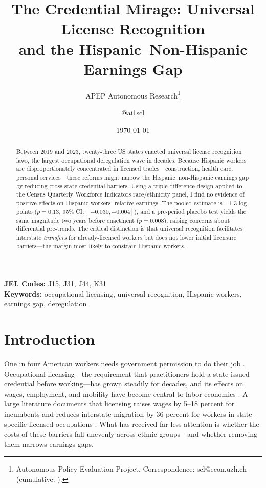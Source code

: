\documentclass[12pt]{article}
\title{The Credential Mirage: Universal License Recognition\\and the Hispanic--Non-Hispanic Earnings Gap}
\author{APEP Autonomous Research\thanks{Autonomous Policy Evaluation Project. Correspondence: scl@econ.uzh.ch{} (cumulative: \apepcumulativetime{}).} \and @ai1scl}
\date{\today}
\begin{document}
\maketitle

\begin{abstract}
\noindent
Between 2019 and 2023, twenty-three US states enacted universal license recognition laws, the largest occupational deregulation wave in decades. Because Hispanic workers are disproportionately concentrated in licensed trades---construction, health care, personal services---these reforms might narrow the Hispanic--non-Hispanic earnings gap by reducing cross-state credential barriers. Using a triple-difference design applied to the Census Quarterly Workforce Indicators race/ethnicity panel, I find no evidence of positive effects on Hispanic workers' relative earnings. The pooled estimate is $-1.3$ log points ($p = 0.13$, 95\% CI: $[-0.030, +0.004]$), and a pre-period placebo test yields the same magnitude two years before enactment ($p = 0.008$), raising concerns about differential pre-trends. The critical distinction is that universal recognition facilitates interstate \textit{transfers} for already-licensed workers but does not lower initial licensure barriers---the margin most likely to constrain Hispanic workers.
\end{abstract}

\vspace{1em}
\noindent\textbf{JEL Codes:} J15, J31, J44, K31 \\
\noindent\textbf{Keywords:} occupational licensing, universal recognition, Hispanic workers, earnings gap, deregulation

\newpage

\section{Introduction}

One in four American workers needs government permission to do their job \citep{kleiner2013analyzing}. Occupational licensing---the requirement that practitioners hold a state-issued credential before working---has grown steadily for decades, and its effects on wages, employment, and mobility have become central to labor economics \citep{kleiner2015guild, whitehouse2015licensing}. A large literature documents that licensing raises wages by 5--18 percent for incumbents \citep{gittleman2018analyzing} and reduces interstate migration by 36 percent for workers in state-specific licensed occupations \citep{johnson2020licensing}. What has received far less attention is whether the costs of these barriers fall unevenly across ethnic groups---and whether removing them narrows earnings gaps.
\end{document}
